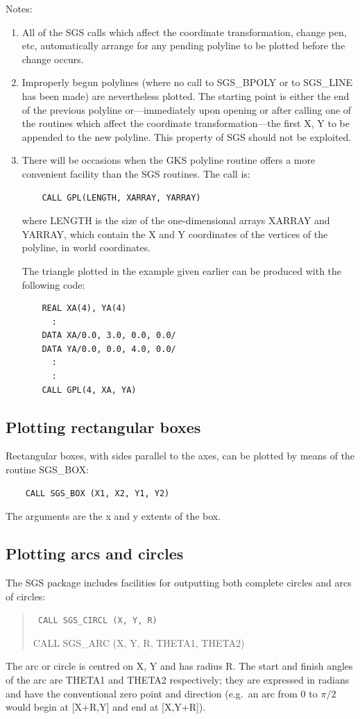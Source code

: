 \documentclass[11pt]{article}
\newcommand{\htmlref}[2]{#1}
\begin{document}
Notes:
\begin{enumerate}
\item All of the SGS calls which affect the coordinate transformation,
change pen, etc,
automatically arrange for any pending
polyline to be plotted before the change occurs.
\item Improperly begun polylines (where no call to SGS\_BPOLY or to SGS\_LINE
has been made) are nevertheless plotted.  The starting point
is either the end of the previous polyline or---immediately upon
opening or after calling one of the routines which affect the
coordinate transformation---the first X, Y to be appended to
the new polyline.  This property of SGS should not be exploited.
\item There will be occasions when the GKS polyline routine
offers a more convenient facility than the SGS
routines.  The call is:
\begin{verbatim}
    CALL GPL(LENGTH, XARRAY, YARRAY)
\end{verbatim}
where LENGTH is the size of the one-dimensional arrays XARRAY and
YARRAY, which contain the X and Y coordinates of the vertices
of the polyline, in world coordinates.

The triangle plotted in the example given earlier can be produced
with the following code:
\begin{verbatim}
    REAL XA(4), YA(4)
      :
    DATA XA/0.0, 3.0, 0.0, 0.0/
    DATA YA/0.0, 0.0, 4.0, 0.0/
      :
      :
    CALL GPL(4, XA, YA)
\end{verbatim}
\end{enumerate}

\subsection {Plotting rectangular boxes}
Rectangular boxes, with sides parallel to the axes, can be plotted
by means of the routine \htmlref{SGS\_BOX}{SGS_BOX}:
\begin{verbatim}
    CALL SGS_BOX (X1, X2, Y1, Y2)
\end{verbatim}
The arguments are the x and y extents of the box.

\subsection {Plotting arcs and circles}
The SGS package includes facilities for outputting both complete
circles and arcs of circles:
\begin{quote}{\tt
    CALL \htmlref{SGS\_CIRCL}{SGS_CIRCL} (X, Y, R)

    CALL \htmlref{SGS\_ARC}{SGS_ARC} (X, Y, R, THETA1, THETA2)}
\end{quote}
The arc or circle is centred on X, Y and has radius R.  The start and
finish angles of the arc are THETA1 and THETA2 respectively;  they are
expressed in radians and have the conventional zero point and direction
(e.g.\ an arc from 0 to $\pi/2$ would begin at [X+R,Y] and end at [X,Y+R]).
\end{document}
